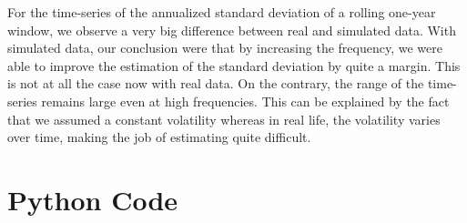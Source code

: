 \documentclass[10pt]{article}
\newenvironment{exercise}[2][Exercise]{\begin{trivlist}
  \item[\hskip \labelsep {\bfseries #1}\hskip \labelsep {\bfseries #2.}]}{\end{trivlist}}
\begin{document}
\begin{exercise}{4}
	\smallbreak
	
	For the time-series of the annualized standard deviation of a rolling one-year window, we observe a very big difference between real and simulated data. With simulated data, our conclusion were that by increasing the frequency, we were able to improve the estimation of the standard deviation by quite a margin. This is not at all the case now with real data. On the contrary, the range of the time-series remains large even at high frequencies. This can be explained by the fact that we assumed a constant volatility whereas in real life, the volatility varies over time, making the job of estimating quite difficult. 
 
  \end{exercise} 

  \section*{Python Code}
  
  
\end{document}

